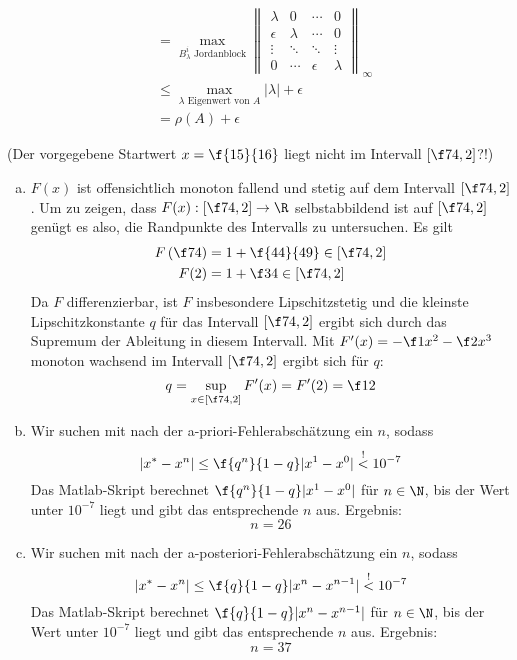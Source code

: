 \documentclass{mywork}
\begin{document}
\begin{aufgabe}
\begin{enumerate}[a)]
\begin{align*}
										&= \max_{B_\lambda^i \text{ Jordanblock}}\left\|\begin{matrix}\lambda & 0 & \cdots & 0\\ \epsilon & \lambda & \cdots & 0\\ \vdots & \ddots & \ddots & \vdots\\0&\cdots & \epsilon & \lambda\end{matrix}\right\|_\infty\\
						 &\le \max_{\lambda \text{ Eigenwert von $A$}}|\lambda| + \epsilon\\
					  &=\rho(A) + \epsilon
				\end{align*}
		\end{enumerate}
	\end{aufgabe}

	\begin{aufgabe}
		(Der vorgegebene Startwert $x=\f {15}{16}$ liegt nicht im Intervall $[\f74,2]$?!)
		\begin{enumerate}[a)]
			\item
				$F(x)$ ist offensichtlich monoton fallend und stetig auf dem Intervall $[\f74,2]$.
				Um zu zeigen, dass $F(x):[\f74,2]\to \R$ selbstabbildend ist auf $[\f74,2]$ genügt es also, die Randpunkte des Intervalls zu untersuchen.
				Es gilt
				\begin{align*}
					F\left(\f74\right) &= 1 + \f{44}{49} \in \left[\f74,2\right]\\
					   F(2) &= 1 + \f34 \in \left[\f74,2\right]
				\end{align*}
				Da $F$ differenzierbar, ist $F$ insbesondere Lipschitzstetig und die kleinste Lipschitzkonstante $q$ für das Intervall $[\f74,2]$ ergibt sich durch das Supremum der Ableitung in diesem Intervall.
				Mit $F'(x) = -\f1{x^2} - \f2{x^3}$ monoton wachsend im Intervall $[\f74,2]$ ergibt sich für $q$:
				\[
					q = \sup_{x\in[\f74,2]}F'(x) = F'(2) = \f12
				\]
			\item
				Wir suchen mit nach der a-priori-Fehlerabschätzung ein $n$, sodass
				\[
					|x^*-x^n| \le \f{q^n}{1-q}|x^1-x^0| \stackrel !< 10^{-7}
				\]
				Das Matlab-Skript berechnet $\f{q^n}{1-q}|x^1-x^0|$ für $n\in \N$, bis der Wert unter $10^{-7}$ liegt und gibt das entsprechende $n$ aus.
				Ergebnis:
				\[
					n=26
				\]
			\item
				Wir suchen mit nach der a-posteriori-Fehlerabschätzung ein $n$, sodass
				\[
					|x^*-x^n| \le \f{q}{1-q}|x^n-x^{n-1}| \stackrel !< 10^{-7}
				\]
				Das Matlab-Skript berechnet $\f{q}{1-q}|x^n-x^{n-1}|$ für $n\in \N$, bis der Wert unter $10^{-7}$ liegt und gibt das entsprechende $n$ aus.
				Ergebnis:
				\[
					n=37
				\]


		\end{enumerate}

	\end{aufgabe}
\end{document}
